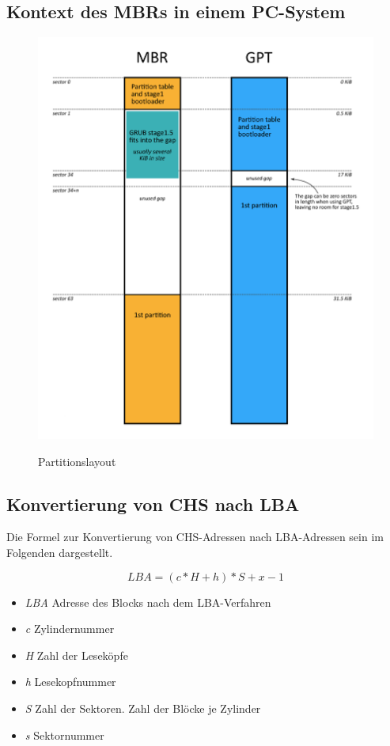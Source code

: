\documentclass[11pt,a4paper]{article}
\begin{document}
\subsection{Kontext des MBRs in einem PC-System}
\begin{figure}[h]
	\caption{Partitionslayout}
	\includegraphics[scale=0.78]{images/mbr_partition_layout.png}
	\label{fig:part_layout}
\end{figure}

\pagebreak{}

\subsection{Konvertierung von CHS nach LBA}
Die Formel zur Konvertierung von CHS-Adressen nach LBA-Adressen sein im Folgenden
dargestellt.

\[
LBA = (c * H + h) * S + x - 1
\]

\begin{itemize}
	\item \emph{LBA} Adresse des Blocks nach dem LBA-Verfahren
	\item \emph{c} Zylindernummer
	\item \emph{H} Zahl der Leseköpfe
	\item \emph{h} Lesekopfnummer
	\item \emph{S} Zahl der Sektoren. Zahl der Blöcke je Zylinder
	\item \emph{s} Sektornummer
\end{itemize}
\end{document}
